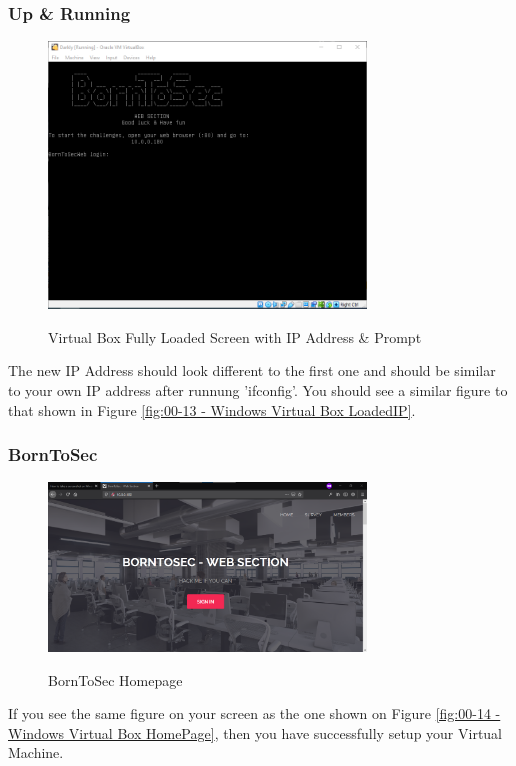 \subsubsection{Up \& Running}

\begin{figure}[!htb]
    \centering
    \includegraphics[width=0.752\textwidth]{images/Win00-13.png}\\[0cm]  
    \caption[Windows Virtual Box]{Virtual Box Fully Loaded Screen with IP Address \& Prompt}
    \label{fig:00-13 - Windows Virtual Box LoadedIP} 

\end{figure}
The new IP Address should look different to the first one and should be similar to
your own IP address after runnung 'ifconfig'.
You should see a similar figure to that shown in Figure \vref{fig:00-13 - Windows Virtual Box LoadedIP}.

\subsubsection{BornToSec}
\begin{figure}[!htb]
    \centering
    \includegraphics[width=0.752\textwidth]{images/Win00-14.png}\\[0cm]  
    \caption[Windows Virtual Box]{BornToSec Homepage}
    \label{fig:00-14 - Windows Virtual Box HomePage} 
\end{figure}
If you see the same figure on your screen as the one shown on Figure \vref{fig:00-14 - Windows Virtual Box HomePage},
then you have successfully setup your Virtual Machine.


